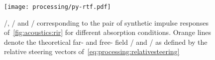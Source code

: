\begin{figure}[b]
    \begin{fullwidth}
        \texttt{[image: processing/py-rtf.pdf]}
        \caption{
            \RIR/, \ILD/ and \IPD/ corresponding to the pair of synthetic impulse responses of~\cref{fig:acoustics:rir} for different absorption conditions.
            Orange lines denote the theoretical far- and free- field \ILD/ and \IPD/ as defined by the relative steering vectors of~\cref{eq:processing:relativesteering}
        }\label{fig:processing:ildipd}
    \end{fullwidth}
\end{figure}



